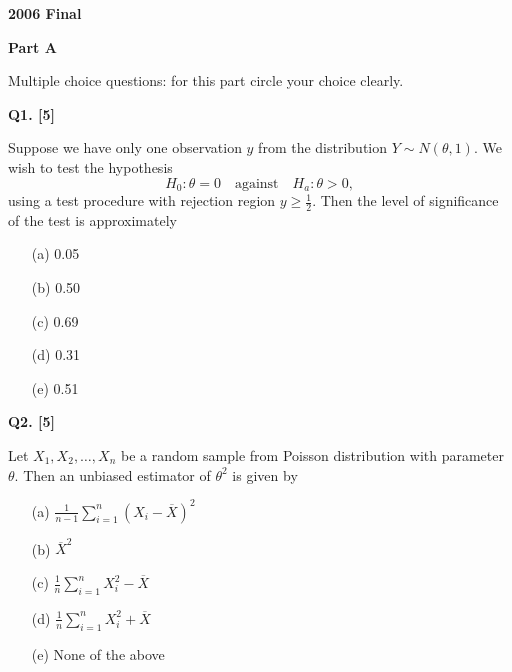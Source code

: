 \documentclass[11pt]{article}
\begin{document}
\clearpage

\begin{center}
    {\Large\bfseries 2006 Final}
\end{center}

\vspace{1em}

\begin{center}
\textbf{Part A}
\end{center}

Multiple choice questions: for this part circle your choice clearly.

\textbf{Q1. [5]}

Suppose we have only one observation $y$ from the distribution $Y\sim N(\theta,1)$. We wish to test the hypothesis
\[
H_0:\theta=0\quad\text{against}\quad H_a:\theta>0,
\]
using a test procedure with rejection region $y\geq\frac12$. Then the level of significance of the test is approximately
\begin{enumerate}
\item[(a)] 0.05
\item[(b)] 0.50
\item[(c)] 0.69
\item[(d)] 0.31
\item[(e)] 0.51
\end{enumerate}

\bigskip

\textbf{Q2. [5]}

Let $X_1,X_2,\ldots,X_n$ be a random sample from Poisson distribution with parameter $\theta$. Then an unbiased estimator of $\theta^2$ is given by
\begin{enumerate}
\item[(a)] $\displaystyle\frac{1}{n-1}\sum_{i=1}^{n}(X_i-\overline X)^2$
\item[(b)] $\displaystyle\overline X^2$
\item[(c)] $\displaystyle\frac{1}{n}\sum_{i=1}^{n}X_i^2-\overline X$
\item[(d)] $\displaystyle\frac{1}{n}\sum_{i=1}^{n}X_i^2+\overline X$
\item[(e)] None of the above
\end{enumerate}
\end{document}
